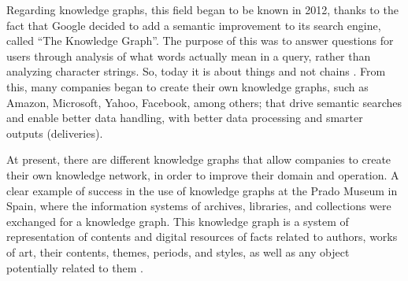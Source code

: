 Regarding knowledge graphs, this field began to be known in 2012, thanks to 
the fact that Google decided to add a semantic improvement to its search 
engine, called “The Knowledge Graph”. The purpose of this was to answer 
questions for users through analysis of what words actually mean in a query, 
rather than analyzing character strings. So, today it is about things and not 
chains \cite{Barnard}. From this, many companies began to create their own 
knowledge graphs, such as Amazon, Microsoft, Yahoo, Facebook, among others; 
that drive semantic searches and enable better data handling, with better 
data processing and smarter outputs (deliveries).

At present, there are different knowledge graphs that allow companies to 
create their own knowledge network, in order to improve their domain and 
operation. A clear example of success in the use of knowledge graphs at the 
Prado Museum in Spain, where the information systems of archives, libraries, 
and collections were exchanged for a knowledge graph. This knowledge graph is 
a system of representation of contents and digital resources of facts related 
to authors, works of art, their contents, themes, periods, and styles, as 
well as any object potentially related to them \cite{Museo del Prado}.

